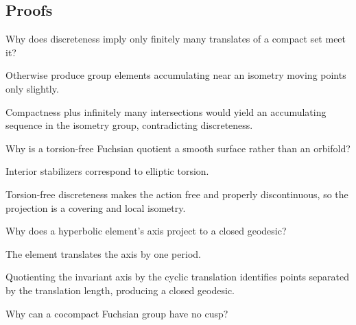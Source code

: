 \subsection*{Proofs}

\begin{exercise}\label{exr:vii35-ped-06}
Why does discreteness imply only finitely many translates of a compact set meet it?
\end{exercise}

\begin{hint}
Otherwise produce group elements accumulating near an isometry moving points only slightly.
\end{hint}

\begin{solution}
Compactness plus infinitely many intersections would yield an accumulating sequence in the isometry group, contradicting discreteness.
\end{solution}

\begin{exercise}\label{exr:vii35-ped-07}
Why is a torsion-free Fuchsian quotient a smooth surface rather than an orbifold?
\end{exercise}

\begin{hint}
Interior stabilizers correspond to elliptic torsion.
\end{hint}

\begin{solution}
Torsion-free discreteness makes the action free and properly discontinuous, so the projection is a covering and local isometry.
\end{solution}

\begin{exercise}\label{exr:vii35-ped-08}
Why does a hyperbolic element's axis project to a closed geodesic?
\end{exercise}

\begin{hint}
The element translates the axis by one period.
\end{hint}

\begin{solution}
Quotienting the invariant axis by the cyclic translation identifies points separated by the translation length, producing a closed geodesic.
\end{solution}

\begin{exercise}\label{exr:vii35-ped-09}
Why can a cocompact Fuchsian group have no cusp?
\end{exercise}

